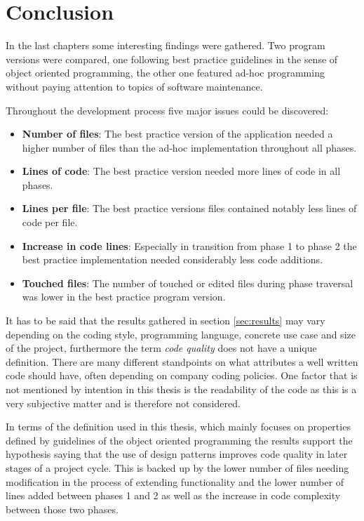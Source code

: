 \chapter{Conclusion}

In the last chapters some interesting findings were gathered. Two program versions were compared, one following best practice guidelines in the sense of object oriented programming, the other one featured ad-hoc programming without paying attention to topics of software maintenance.

Throughout the development process five major issues could be discovered:

\begin{itemize}
	\item \textbf{Number of files}: The best practice version of the application needed a higher number of files than the ad-hoc implementation throughout all phases.
	\item \textbf{Lines of code}: The best practice version needed more lines of code in all phases.
	\item \textbf{Lines per file}: The best practice versions files contained notably less lines of code per file.
	\item \textbf{Increase in code lines}: Especially in transition from phase 1 to phase 2 the best practice implementation needed considerably less code additions.
	\item \textbf{Touched files}: The number of touched or edited files during phase traversal was lower in the best practice program version.
\end{itemize}

It has to be said that the results gathered in section \ref{sec:results} may vary depending on the coding style, programming language, concrete use case and size of the project, furthermore the term \emph{code quality} does not have a unique definition. There are many different standpoints on what attributes a well written code should have, often depending on company coding policies. One factor that is not mentioned by intention in this thesis is the readability of the code as this is a very subjective matter and is therefore not considered. 

In terms of the definition used in this thesis, which mainly focuses on properties defined by guidelines of the object oriented programming the results support the hypothesis saying that the use of design patterns improves code quality in later stages of a project cycle. This is backed up by the lower number of files needing modification in the process of extending functionality and the lower number of lines added between phases 1 and 2 as well as the increase in code complexity between those two phases.

